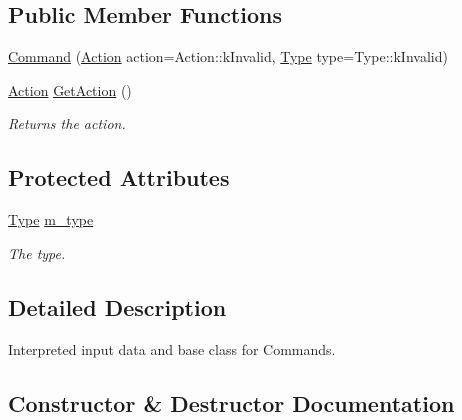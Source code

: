 \subsection*{Public Member Functions}
\begin{DoxyCompactItemize}
\item 
\mbox{\hyperlink{class_command_aa511383ade72a941cb61c8498bdf1807}{Command}} (\mbox{\hyperlink{class_command_a45bbda49e9ee96d262ac651fefffe487}{Action}} action=Action\+::k\+Invalid, \mbox{\hyperlink{class_command_a4ca33b8d40e12deca5e7bb4190426ee1}{Type}} type=Type\+::k\+Invalid)
\item 
\mbox{\label{class_command_a09802e64142f3c825555b6e77252974e}} 
\mbox{\hyperlink{class_command_a45bbda49e9ee96d262ac651fefffe487}{Action}} \mbox{\hyperlink{class_command_a09802e64142f3c825555b6e77252974e}{Get\+Action}} ()
\begin{DoxyCompactList}\small\item\em Returns the action. \end{DoxyCompactList}\end{DoxyCompactItemize}
\subsection*{Protected Attributes}
\begin{DoxyCompactItemize}
\item 
\mbox{\label{class_command_aa4b7374825c05006b00ca76c9ed5a021}} 
\mbox{\hyperlink{class_command_a4ca33b8d40e12deca5e7bb4190426ee1}{Type}} \mbox{\hyperlink{class_command_aa4b7374825c05006b00ca76c9ed5a021}{m\+\_\+type}}
\begin{DoxyCompactList}\small\item\em The type. \end{DoxyCompactList}\end{DoxyCompactItemize}


\subsection{Detailed Description}
Interpreted input data and base class for Commands. 

\subsection{Constructor \& Destructor Documentation}
\mbox{\label{class_command_aa511383ade72a941cb61c8498bdf1807}} 
